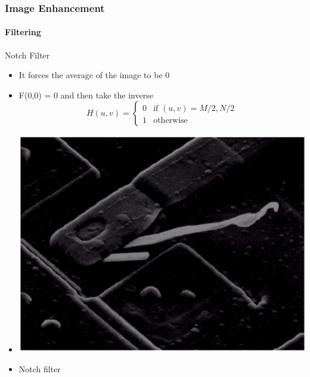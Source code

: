 \documentclass{beamer}
\begin{document}
\begin{frame}
\frametitle{Image Enhancement}
\framesubtitle{Filtering}
\begin{block}{Notch Filter}
\begin{itemize}
	\item It forces the average of the image to be 0 
	\item F(0,0) = 0 and then take the inverse 
	\[
 	H(u,v) = 
  	\begin{cases} 
   	0 & \text{if } (u,v) = M/2, N/2 \\
   	1 & \text{otherwise}
  	\end{cases}
	\]
	\item []
	\begin{center}
	\includegraphics[scale=0.2]{images/F1_ex_notch.png}
	\end{center}
	\item [] \begin{center} Notch filter \end{center}
\end{itemize}
\end{block}
\end{frame}
\end{document}
